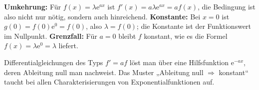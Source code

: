 \begin{kontrolle}
\textbf{Umkehrung:} Für $f(x)=\lambda\mathrm e^{ax}$ ist $f'(x)=a\lambda\mathrm e^{ax}=af(x)$,
die Bedingung ist also nicht nur nötig, sondern auch hinreichend.
\textbf{Konstante:} Bei $x=0$ ist $g(0)=f(0)\mathrm e^{0}=f(0)$, also
$\lambda=f(0)$; die Konstante ist der Funktionswert im Nullpunkt.
\textbf{Grenzfall:} Für $a=0$ bleibt $f$ konstant, wie es die Formel
$f(x)=\lambda\mathrm e^{0}=\lambda$ liefert.
\end{kontrolle}

\begin{merksatz}
Differentialgleichungen des Typs $f'=af$ löst man über eine
Hilfsfunktion $\mathrm e^{-ax}$, deren Ableitung null man nachweist. Das
Muster „Ableitung null $\Rightarrow$ konstant“ taucht bei allen Charakterisierungen
von Exponentialfunktionen auf.
\end{merksatz}
